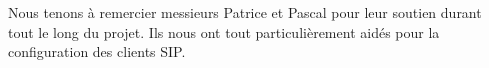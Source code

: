 
Nous tenons à remercier messieurs Patrice  et Pascal  pour leur soutien durant tout le long du projet. Ils nous ont tout particulièrement aidés pour la configuration des clients SIP.